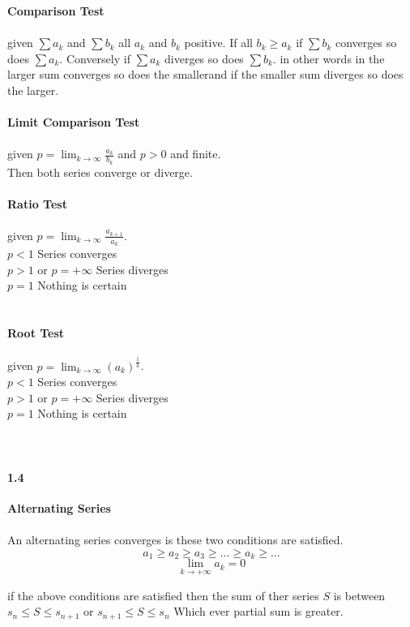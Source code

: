 \documentclass[14pt]{extreport}
\begin{document}
\textbf{Comparison Test}\\\\
given $\sum a_k$ and $\sum b_k$ all $a_k$ and $b_k$ positive. If all $b_k \ge a_k$ if $\sum b_k$ converges so does $\sum a_k$. Conversely if $\sum a_k$ diverges so does $\sum b_k$. in other words in the larger sum converges so does the smallerand if the smaller sum diverges so does the larger. 
\\\\
\textbf{Limit Comparison Test}\\\\
given $p = \lim_{k \to \infty} \frac{a_k}{b_k}$ and $p > 0$ and finite. \\
Then both series converge or diverge.
\\\\
\textbf{Ratio Test}\\\\
given $p = \lim_{k \to \infty} \frac{a_{k+1}}{a_k}$.\\
$p < 1$ Series converges\\
$p > 1$ or $p = +\infty$  Series diverges\\
$p = 1$ Nothing is certain\\
\\\\
\textbf{Root Test}\\\\
given $p = \lim_{k \to \infty} (a_k)^{\frac{1}{k}}$.\\
$p < 1$ Series converges\\
$p > 1$ or $p = +\infty$  Series diverges\\
$p = 1$ Nothing is certain\\
\\\\

\paragraph{1.4}\textbf{Alternating Series}\\\\

An alternating series converges is these two conditions are satisfied.\\
$$a_1 \ge a_2 \ge a_3 \ge \ldots \ge a_k \ge \ldots$$
$$\lim_{k \to +\infty} a_k = 0$$

if the above conditions are satisfied then the sum of ther series $S$ is between $s_n \le S \le s_{n+1}$ or  $s_{n+1} \le S \le s_n$ Which ever partial sum is greater.\\
\end{document}
